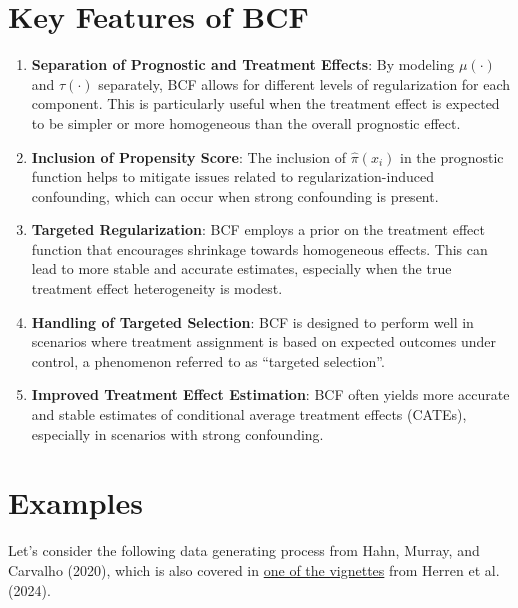 \documentclass[
  letterpaper,
  DIV=11,
  numbers=noendperiod]{scrreprt}
\providecommand{\tightlist}{%
  \setlength{\itemsep}{0pt}\setlength{\parskip}{0pt}}\usepackage{longtable,booktabs,array}
\begin{document}
\section{Key Features of BCF}\label{key-features-of-bcf}

\begin{enumerate}
\def\labelenumi{\arabic{enumi}.}
\tightlist
\item
  \textbf{Separation of Prognostic and Treatment Effects}: By modeling
  \(\mu(\cdot)\) and \(\tau(\cdot)\) separately, BCF allows for
  different levels of regularization for each component. This is
  particularly useful when the treatment effect is expected to be
  simpler or more homogeneous than the overall prognostic effect.
\item
  \textbf{Inclusion of Propensity Score}: The inclusion of
  \(\hat{\pi}(x_i)\) in the prognostic function helps to mitigate issues
  related to regularization-induced confounding, which can occur when
  strong confounding is present.
\item
  \textbf{Targeted Regularization}: BCF employs a prior on the treatment
  effect function that encourages shrinkage towards homogeneous effects.
  This can lead to more stable and accurate estimates, especially when
  the true treatment effect heterogeneity is modest.
\item
  \textbf{Handling of Targeted Selection}: BCF is designed to perform
  well in scenarios where treatment assignment is based on expected
  outcomes under control, a phenomenon referred to as ``targeted
  selection''.
\item
  \textbf{Improved Treatment Effect Estimation}: BCF often yields more
  accurate and stable estimates of conditional average treatment effects
  (CATEs), especially in scenarios with strong confounding.
\end{enumerate}

\section{Examples}\label{examples-1}

Let's consider the following data generating process from Hahn, Murray,
and Carvalho (2020), which is also covered in
\href{https://stochastictree.github.io/stochtree-r/articles/CausalInference.html\#demo-1-nonlinear-outcome-model-heterogeneous-treatment-effect}{one
of the vignettes} from Herren et al. (2024).
\end{document}

